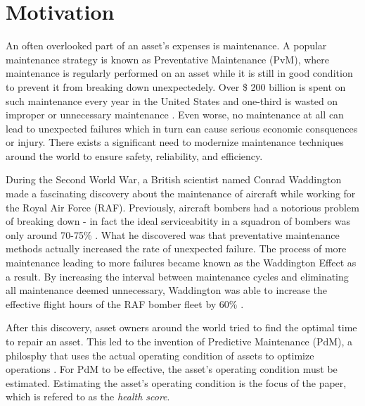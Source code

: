 \section*{Motivation}

An often overlooked part of an asset's expenses is maintenance.
A popular maintenance strategy is known as Preventative Maintenance (PvM), 
where maintenance is regularly performed on an asset while it is still in good condition to prevent it from breaking down unexpectedely.
Over \$ 200 billion is spent on such maintenance every year in the United States and one-third is wasted on improper or unnecessary maintenance \cite{mobley2002introduction}.
Even worse, no maintenance at all can lead to unexpected failures which in turn can cause serious economic consquences or injury.
There exists a significant need to modernize maintenance techniques around the world to ensure safety, reliability, and efficiency.

During the Second World War, a British scientist named Conrad Waddington made a fascinating discovery about the maintenance of aircraft while working for the Royal Air Force (RAF).
Previously, aircraft bombers had a notorious problem of breaking down - in fact the ideal serviceabitity in a squadron of bombers was only around 70-75\% \cite{Morse1364}.
What he discovered was that preventative maintenance methods actually increased the rate of unexpected failure.
The process of more maintenance leading to more failures became known as the Waddington Effect as a result.
By increasing the interval between maintenance cycles and eliminating all maintenance deemed unnecessary,
Waddington was able to increase the effective flight hours of the RAF bomber fleet by 60\% \cite{Morse1364}.

After this discovery, asset owners around the world tried to find the optimal time to repair an asset.
This led to the invention of Predictive Maintenance (PdM), a philosphy that uses the actual operating condition of assets to optimize operations \cite{mobley2002introduction}.
For PdM to be effective, the asset's operating condition must be estimated.
Estimating the asset's operating condition is the focus of the paper, which is refered to as the \textit{health score}.